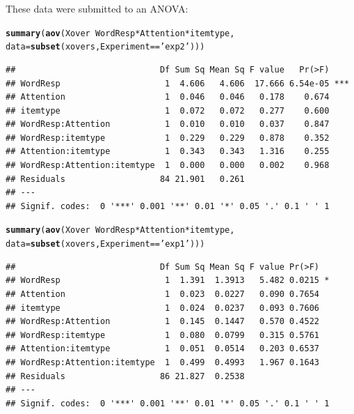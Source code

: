 \documentclass[11pt]{article}\usepackage[]{graphicx}\usepackage[]{color}
\makeatletter
\newcommand{\hlstr}[1]{\textcolor[rgb]{0.192,0.494,0.8}{#1}}%
\newcommand{\hlopt}[1]{\textcolor[rgb]{0,0,0}{#1}}%
\newcommand{\hlstd}[1]{\textcolor[rgb]{0.345,0.345,0.345}{#1}}%
\newcommand{\hlkwc}[1]{\textcolor[rgb]{0.333,0.667,0.333}{#1}}%
\newcommand{\hlkwd}[1]{\textcolor[rgb]{0.737,0.353,0.396}{\textbf{#1}}}%
\newenvironment{kframe}{%
 \def\at@end@of@kframe{}%
 \ifinner\ifhmode%
  \def\at@end@of@kframe{\end{minipage}}%
  \begin{minipage}{\columnwidth}%
 \fi\fi%
 \def\FrameCommand##1{\hskip\@totalleftmargin \hskip-\fboxsep
 \colorbox{shadecolor}{##1}\hskip-\fboxsep
     \hskip-\linewidth \hskip-\@totalleftmargin \hskip\columnwidth}%
 \MakeFramed {\advance\hsize-\width
   \@totalleftmargin\z@ \linewidth\hsize
   \@setminipage}}%
 {\par\unskip\endMakeFramed%
 \at@end@of@kframe}
\newenvironment{knitrout}{}{} %
\makeatother
\begin{document}
These data were submitted to an ANOVA:

\begin{knitrout}\footnotesize
{}\color{fgcolor}\begin{kframe}
\begin{alltt}
 \hlkwd{summary}\hlstd{(}\hlkwd{aov}\hlstd{(Xover} \hlopt{~} \hlstd{WordResp}\hlopt{*}\hlstd{Attention}\hlopt{*}\hlstd{itemtype,}
 \hlkwc{data} \hlstd{=} \hlkwd{subset}\hlstd{(xovers, Experiment} \hlopt{==} \hlstr{'exp2'}\hlstd{)))}
\end{alltt}
\begin{verbatim}
##                             Df Sum Sq Mean Sq F value   Pr(>F)    
## WordResp                     1  4.606   4.606  17.666 6.54e-05 ***
## Attention                    1  0.046   0.046   0.178    0.674    
## itemtype                     1  0.072   0.072   0.277    0.600    
## WordResp:Attention           1  0.010   0.010   0.037    0.847    
## WordResp:itemtype            1  0.229   0.229   0.878    0.352    
## Attention:itemtype           1  0.343   0.343   1.316    0.255    
## WordResp:Attention:itemtype  1  0.000   0.000   0.002    0.968    
## Residuals                   84 21.901   0.261                     
## ---
## Signif. codes:  0 '***' 0.001 '**' 0.01 '*' 0.05 '.' 0.1 ' ' 1
\end{verbatim}
\begin{alltt}
 \hlkwd{summary}\hlstd{(}\hlkwd{aov}\hlstd{(Xover} \hlopt{~} \hlstd{WordResp}\hlopt{*}\hlstd{Attention}\hlopt{*}\hlstd{itemtype,}
 \hlkwc{data} \hlstd{=} \hlkwd{subset}\hlstd{(xovers, Experiment} \hlopt{==} \hlstr{'exp1'}\hlstd{)))}
\end{alltt}
\begin{verbatim}
##                             Df Sum Sq Mean Sq F value Pr(>F)  
## WordResp                     1  1.391  1.3913   5.482 0.0215 *
## Attention                    1  0.023  0.0227   0.090 0.7654  
## itemtype                     1  0.024  0.0237   0.093 0.7606  
## WordResp:Attention           1  0.145  0.1447   0.570 0.4522  
## WordResp:itemtype            1  0.080  0.0799   0.315 0.5761  
## Attention:itemtype           1  0.051  0.0514   0.203 0.6537  
## WordResp:Attention:itemtype  1  0.499  0.4993   1.967 0.1643  
## Residuals                   86 21.827  0.2538                 
## ---
## Signif. codes:  0 '***' 0.001 '**' 0.01 '*' 0.05 '.' 0.1 ' ' 1
\end{verbatim}
\end{kframe}
\end{knitrout}
\end{document}
